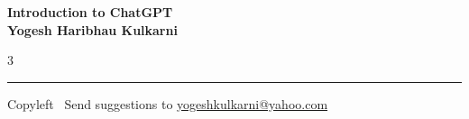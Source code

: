 \documentclass[8pt,landscape]{article}
\begin{document}
\footnotesize


\begin{center}
\Large{\textbf{Introduction to ChatGPT\\ Yogesh Haribhau Kulkarni}}
\end{center}

\begin{multicols}{3}

\end{multicols}

\rule{\linewidth}{0.25pt}
\scriptsize
Copyleft \textcopyleft\  Send suggestions to
\href{http://www.yogeshkulkarni.com}{yogeshkulkarni@yahoo.com}
\end{document}
